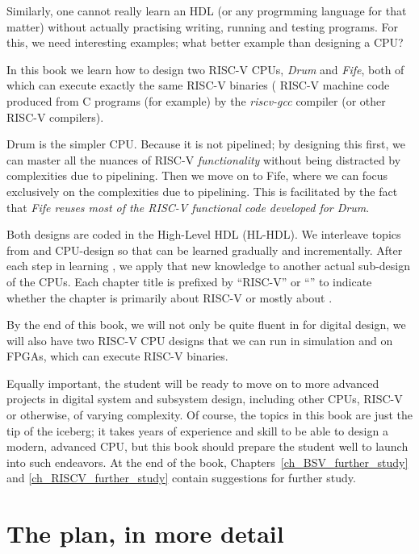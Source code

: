 Similarly, one cannot really learn an HDL (or any progrmming language
for that matter) without actually practising writing, running and
testing programs.  For this, we need interesting examples; what better
example than designing a CPU?

In this book we learn how to design two RISC-V CPUs, \emph{Drum} and
\emph{Fife}, both of which can execute exactly the same RISC-V
binaries ({\ie} RISC-V machine code produced from C programs (for
example) by the \emph{riscv-gcc} compiler (or other RISC-V compilers).

Drum is the simpler CPU. Because it is not pipelined; by designing
this first, we can master all the nuances of RISC-V
\emph{functionality} without being distracted by complexities due to
pipelining.  Then we move on to Fife, where we can focus exclusively
on the complexities due to pipelining.  This is facilitated by the
fact that \emph{Fife reuses most of the RISC-V functional code
developed for Drum}.

Both designs are coded in the {\BSV} High-Level HDL (HL-HDL).  We
interleave topics from {\BSV} and CPU-design so that {\BSV} can be learned
gradually and incrementally.  After each step in learning {\BSV}, we
apply that new knowledge to another actual sub-design of the CPUs.
Each chapter title is prefixed by ``RISC-V'' or ``{\BSV}'' to indicate
whether the chapter is primarily about RISC-V or mostly about {\BSV}.

By the end of this book, we will not only be quite fluent in {\BSV} for
digital design, we will also have two RISC-V CPU designs that we can
run in simulation and on FPGAs, {\ie} which can execute RISC-V
binaries.

Equally important, the student will be ready to move on to more
advanced projects in digital system and subsystem design, including
other CPUs, RISC-V or otherwise, of varying complexity.  Of course,
the topics in this book are just the tip of the iceberg; it takes
years of experience and skill to be able to design a modern, advanced
CPU, but this book should prepare the student well to launch into such
endeavors.  At the end of the book,
Chapters~\ref{ch_BSV_further_study} and \ref{ch_RISCV_further_study}
contain suggestions for further study.


\section{The plan, in more detail}

